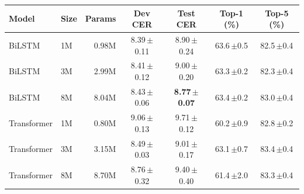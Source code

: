 \begin{tabular}{llrcccc}
\toprule
Model & Size & Params & Dev CER & Test CER & Top-1 (\%) & Top-5 (\%) \\
\midrule
BiLSTM & 1M & 0.98M & 8.39\,{\scriptsize$\pm$0.11} & 8.90\,{\scriptsize$\pm$0.24} & 63.6\,{\scriptsize$\pm$0.5} & 82.5\,{\scriptsize$\pm$0.4} \\
BiLSTM & 3M & 2.99M & 8.41\,{\scriptsize$\pm$0.12} & 9.00\,{\scriptsize$\pm$0.20} & 63.3\,{\scriptsize$\pm$0.2} & 82.3\,{\scriptsize$\pm$0.4} \\
BiLSTM & 8M & 8.04M & 8.43\,{\scriptsize$\pm$0.06} & \textbf{8.77\,{\scriptsize$\pm$0.07}} & 63.4\,{\scriptsize$\pm$0.2} & 83.0\,{\scriptsize$\pm$0.4} \\
\midrule
Transformer & 1M & 0.80M & 9.06\,{\scriptsize$\pm$0.13} & 9.71\,{\scriptsize$\pm$0.12} & 60.2\,{\scriptsize$\pm$0.9} & 82.8\,{\scriptsize$\pm$0.2} \\
Transformer & 3M & 3.15M & 8.49\,{\scriptsize$\pm$0.03} & 9.01\,{\scriptsize$\pm$0.17} & 63.1\,{\scriptsize$\pm$0.7} & 83.4\,{\scriptsize$\pm$0.4} \\
Transformer & 8M & 8.70M & 8.76\,{\scriptsize$\pm$0.32} & 9.40\,{\scriptsize$\pm$0.40} & 61.4\,{\scriptsize$\pm$2.0} & 83.3\,{\scriptsize$\pm$0.4} \\
\bottomrule
\end{tabular}